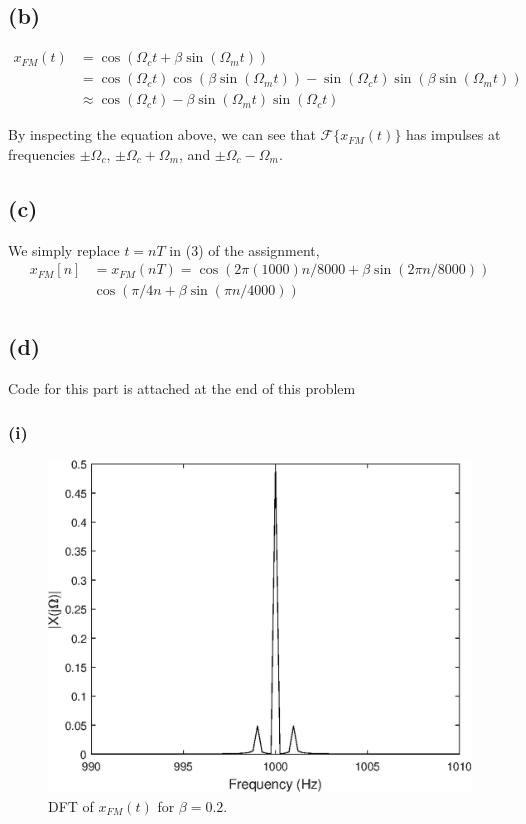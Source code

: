 \documentclass{article}
\begin{document}
\subsection{(b)}

\begin{align} \nonumber \label{xfmapprox}
	x_{FM}(t) &= \cos(\Omega_ct + \beta\sin(\Omega_m t)) \\ \nonumber
	&= \cos(\Omega_ct)\cos(\beta\sin(\Omega_m t)) - \sin(\Omega_ct)\sin(\beta\sin(\Omega_m t)) \\ 
	& \approx \cos(\Omega_ct) - \beta\sin(\Omega_m t)\sin(\Omega_ct) \tag{small-angle approximation when $\beta << \pi/2$}
\end{align}

By inspecting the equation above, we can see that $\mathcal{F}\{x_{FM}(t)\}$ has impulses at frequencies $\pm\Omega_c$, $\pm\Omega_c + \Omega_m$, and $\pm\Omega_c - \Omega_m$.

\subsection{(c)}

We simply replace $t = nT$ in (3) of the assignment, 
\begin{align} \nonumber
	x_{FM}[n] &= x_{FM}(nT) = \cos(2\pi(1000) n/8000 + \beta\sin(2\pi n/8000)) \\
	&\cos(\pi/4 n + \beta\sin(\pi n/4000))
\end{align}

\subsection{(d)}
Code for this part is attached at the end of this problem

\subsubsection{(i)}
\FloatBarrier
\begin{figure}[h!]
	\centering
	\includegraphics[scale=0.7]{figs/hw6_fm_di.eps}
	\caption{DFT of $x_{FM}(t)$ for $\beta = 0.2$.}
\end{figure}
\FloatBarrier
\end{document}

